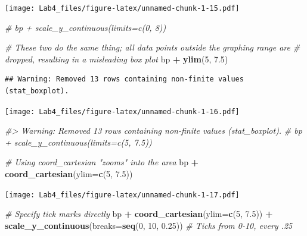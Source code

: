 \documentclass[]{article}
\newenvironment{Shaded}{\begin{snugshade}}{\end{snugshade}}
\newcommand{\KeywordTok}[1]{\textcolor[rgb]{0.13,0.29,0.53}{\textbf{#1}}}
\newcommand{\DataTypeTok}[1]{\textcolor[rgb]{0.13,0.29,0.53}{#1}}
\newcommand{\DecValTok}[1]{\textcolor[rgb]{0.00,0.00,0.81}{#1}}
\newcommand{\FloatTok}[1]{\textcolor[rgb]{0.00,0.00,0.81}{#1}}
\newcommand{\StringTok}[1]{\textcolor[rgb]{0.31,0.60,0.02}{#1}}
\newcommand{\CommentTok}[1]{\textcolor[rgb]{0.56,0.35,0.01}{\textit{#1}}}
\newcommand{\OperatorTok}[1]{\textcolor[rgb]{0.81,0.36,0.00}{\textbf{#1}}}
\newcommand{\NormalTok}[1]{#1}
\begin{document}
\texttt{[image: Lab4\_files/figure-latex/unnamed-chunk-1-15.pdf]}

\begin{Shaded}
\begin{Highlighting}[]
\CommentTok{# bp + scale_y_continuous(limits=c(0, 8))}

\CommentTok{# These two do the same thing; all data points outside the graphing range are}
\CommentTok{# dropped, resulting in a misleading box plot}
\NormalTok{bp }\OperatorTok{+}\StringTok{ }\KeywordTok{ylim}\NormalTok{(}\DecValTok{5}\NormalTok{, }\FloatTok{7.5}\NormalTok{)}
\end{Highlighting}
\end{Shaded}

\begin{verbatim}
## Warning: Removed 13 rows containing non-finite values (stat_boxplot).
\end{verbatim}

\texttt{[image: Lab4\_files/figure-latex/unnamed-chunk-1-16.pdf]}

\begin{Shaded}
\begin{Highlighting}[]
\CommentTok{#> Warning: Removed 13 rows containing non-finite values (stat_boxplot).}
\CommentTok{# bp + scale_y_continuous(limits=c(5, 7.5))}

\CommentTok{# Using coord_cartesian "zooms" into the area}
\NormalTok{bp }\OperatorTok{+}\StringTok{ }\KeywordTok{coord_cartesian}\NormalTok{(}\DataTypeTok{ylim=}\KeywordTok{c}\NormalTok{(}\DecValTok{5}\NormalTok{, }\FloatTok{7.5}\NormalTok{))}
\end{Highlighting}
\end{Shaded}

\texttt{[image: Lab4\_files/figure-latex/unnamed-chunk-1-17.pdf]}

\begin{Shaded}
\begin{Highlighting}[]
\CommentTok{# Specify tick marks directly}
\NormalTok{bp }\OperatorTok{+}\StringTok{ }\KeywordTok{coord_cartesian}\NormalTok{(}\DataTypeTok{ylim=}\KeywordTok{c}\NormalTok{(}\DecValTok{5}\NormalTok{, }\FloatTok{7.5}\NormalTok{)) }\OperatorTok{+}\StringTok{ }
\StringTok{    }\KeywordTok{scale_y_continuous}\NormalTok{(}\DataTypeTok{breaks=}\KeywordTok{seq}\NormalTok{(}\DecValTok{0}\NormalTok{, }\DecValTok{10}\NormalTok{, }\FloatTok{0.25}\NormalTok{))  }\CommentTok{# Ticks from 0-10, every .25}
\end{Highlighting}
\end{Shaded}
\end{document}
